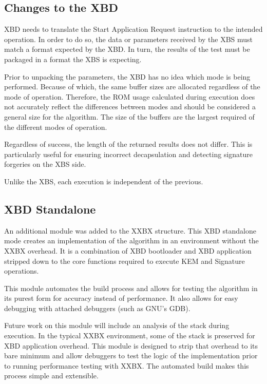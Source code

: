 \documentclass[10pt]{article}
\begin{document}
\subsection{Changes to the XBD}
XBD needs to translate the Start Application Request instruction to the intended operation. 
In order to do so, the data or parameters received by the XBS must match a format expected 
by the XBD. In turn, the results of the test must be packaged in a format the XBS is expecting.

Prior to unpacking the parameters, the XBD has no idea which mode is being performed. 
Because of which, the same buffer sizes are allocated regardless of the mode of operation. 
Therefore, the ROM usage calculated during execution does not accurately reflect the differences 
between modes and should be considered a general size for the algorithm. 
The size of the buffers are the largest required of the different modes of operation.

Regardless of success, the length of the returned results does not differ. 
This is particularly useful for ensuring incorrect decapsulation and detecting signature 
forgeries on the XBS side.

Unlike the XBS, each execution is independent of the previous.

\subsection{XBD Standalone}
An additional module was added to the XXBX structure. This XBD standalone mode creates 
an implementation of the algorithm in an environment without the XXBX overhead. It is a 
combination of XBD bootloader and XBD application stripped down to the core functions 
required to execute KEM and Signature operations.

This module automates the build process and allows for testing the algorithm in its purest 
form for accuracy instead of performance. It also allows for easy debugging with attached 
debuggers (such as GNU’s GDB).

Future work on this module will include an analysis of the stack during execution. 
In the typical XXBX environment, some of the stack is preserved for XBD application overhead. 
This module is designed to strip that overhead to its bare minimum and allow debuggers to 
test the logic of the implementation prior to running performance testing with XXBX. 
The automated build makes this process simple and extensible.
\end{document}
